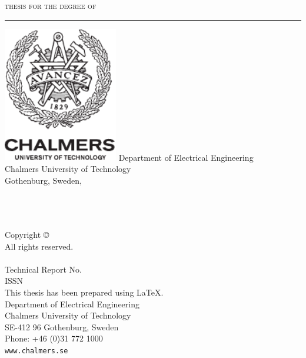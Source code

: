 \documentclass[
  paper=16.9cm:23.9cm,
  pagesize,
  twoside,
  10pt,
  chapterprefix,
  headsepline=on,
  footinclude=off,
  DIV=18,
  BCOR=7mm,
  bibliography=totoc,
  numbers=noenddot,
  open=right,
]{scrreprt}
\begin{document}
\EmptyPage %

\thispagestyle{empty}

\begin{center}
\textsc{thesis for the degree of \TheThesisType}
\vspace{0.5cm}
\hrule
\vspace{3 cm}
{\Large {\TitlePageTitle}\par}
\vspace{1 cm}
{\large\textsc{\TitlePageName}\par}
\vspace{2 cm}
\includegraphics[width=5cm]{TemplateFiles/logos/chalmers_logo_black}
\vfill
\vspace{0.5 cm}
Department of Electrical Engineering \\
Chalmers University of Technology \\
Gothenburg, Sweden, \TheYear
\end{center}

\newpage

\thispagestyle{empty}

\textbf{\ISSNPageTitle}\\\\
{\textsc{\ISSNPageName}}
\vspace{4.0 cm}\\
Copyright \copyright~\TheYear~\textsc{\ISSNPageName}\\ All rights reserved.\\
\vspace{1.5 cm}\\
Technical Report No.~\TheReportNo \\
ISSN \TheISSN\\
\vspace{1 cm}%
This thesis has been prepared using \LaTeX.\\
Department of Electrical Engineering \\
Chalmers University of Technology \\
SE-412 96 Gothenburg, Sweden \\
Phone: +46 (0)31 772 1000 \\
\texttt{www.chalmers.se} \\
\vfill
{}
\end{document}
